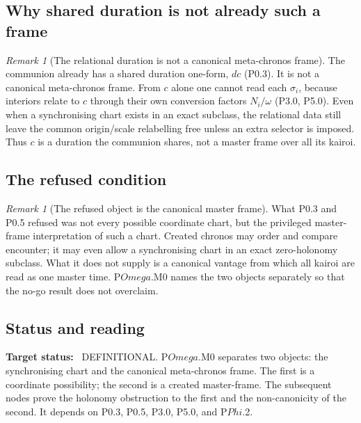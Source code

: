 \documentclass[11pt,a4paper]{article}
\def\Omega{Omega}%
\def\Phi{Phi}%
\def\mathfrak#1{#1}%
\newcommand{\stDef}{\textcolor{cDef}{\textsf{\small DEFINITIONAL}}}
\theoremstyle{definition}
\theoremstyle{plain}
\theoremstyle{remark}
\newtheorem{remark}[definition]{Remark}
\begin{document}
\subsection{Why shared duration is not already such a frame}

\begin{remark}[The relational duration is not a canonical meta-chronos frame]\label{rem:cnotframe}
The communion already has a shared duration one-form, \(d\mathfrak c\) (P0.3). It
is not a canonical meta-chronos frame. From \(\mathfrak c\) alone one cannot read
each \(\sigma_i\), because interiors relate to \(\mathfrak c\) through their own
conversion factors \(N_i/\omega\) (P3.0, P5.0). Even when a synchronising chart
exists in an exact subclass, the relational data still leave the common
origin/scale relabelling free unless an extra selector is imposed. Thus
\(\mathfrak c\) is a duration the communion shares, not a master frame over all
its kairoi.
\end{remark}

\subsection{The refused condition}

\begin{remark}[The refused object is the canonical master frame]\label{rem:refused}
What P0.3 and P0.5 refused was not every possible coordinate chart, but the
privileged master-frame interpretation of such a chart. Created chronos may order
and compare encounter; it may even allow a synchronising chart in an exact
zero-holonomy subclass. What it does not supply is a canonical vantage from which
all kairoi are read as one master time. P\(\Omega\).M0 names the two objects
separately so that the no-go result does not overclaim.
\end{remark}

\subsection{Status and reading}

\textbf{Target status:}~
\stDef. P\(\Omega\).M0 separates two objects: the synchronising chart and the
canonical meta-chronos frame. The first is a coordinate possibility; the second is
a created master-frame. The subsequent nodes prove the holonomy obstruction to the
first and the non-canonicity of the second. It depends on P0.3, P0.5, P3.0, P5.0,
and P\(\Phi\).2.
\end{document}
